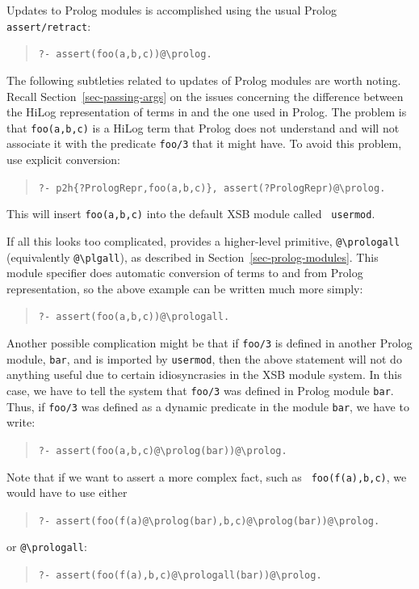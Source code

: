 \documentclass[11pt]{article}
\newcommand{\ERGO}{\mbox{\smaller{\ensuremath{\cal{E}}\smaller{{\sc{RGO}}}}}\xspace}
\newcommand{\FLSYSTEM}{\ERGO}
\newcommand{\bs}{\textbackslash}
\begin{document}
Updates to Prolog modules is accomplished using the usual
Prolog {\tt assert/retract}:
\begin{quote}
 {\tt ?- assert(foo(a,b,c))@\bs{}prolog.  }
\end{quote}
The following subtleties related to updates of Prolog modules are worth
noting. Recall Section~\ref{sec-passing-args} on the issues concerning the
difference between the HiLog representation of terms in \FLSYSTEM and the one
used in Prolog. The problem is that {\tt foo(a,b,c)} is a HiLog term that
Prolog does not understand and will not associate it with the predicate
{\tt foo/3} that it might have. To avoid this problem, use explicit conversion:
\begin{quote}
 {\tt ?- p2h\{?PrologRepr,foo(a,b,c)\}, assert(?PrologRepr)@\bs{}prolog.  }
\end{quote}
This will insert {\tt foo(a,b,c)} into the default XSB module called {\tt
  usermod}.

\index{"@\bs{}prologall}
\index{"@\bs{}plgall}
If all this looks too complicated, \FLSYSTEM provides a higher-level
primitive, {\tt @\bs{}prologall} (equivalently {\tt @\bs{}plgall}), as described in
Section~\ref{sec-prolog-modules}. This module specifier does automatic
conversion of terms to and from Prolog representation, so the above example
can be written much more simply:
\begin{quote}
 {\tt ?- assert(foo(a,b,c))@\bs{}prologall.  }  
\end{quote}

Another possible complication might be that
if {\tt foo/3} is defined in another Prolog module, {\tt bar}, and
is imported by {\tt usermod}, then the above statement will not do anything
useful due to certain idiosyncrasies in the XSB module system. In this
case, we have to tell the system that {\tt foo/3} was defined in Prolog
module {\tt bar}.  Thus, if
{\tt foo/3} was defined as a dynamic predicate in the module
  {\tt bar}, we have to write:
\begin{quote}
 {\tt ?- assert(foo(a,b,c)@\bs{}prolog(bar))@\bs{}prolog.  }  
\end{quote}
Note that if we want to assert a more complex fact, such as {\tt
  foo(f(a),b,c)}, we would have to use either
\begin{quote}
 {\tt ?- assert(foo(f(a)@\bs{}prolog(bar),b,c)@\bs{}prolog(bar))@\bs{}prolog.}  
\end{quote}
or {\tt @\bs{}prologall}:
\begin{quote}
 {\tt ?- assert(foo(f(a),b,c)@\bs{}prologall(bar))@\bs{}prolog.}  
\end{quote}
\end{document}
